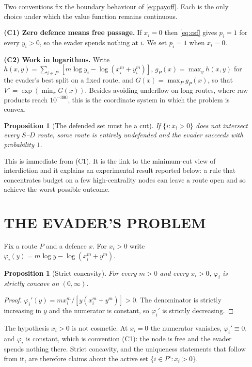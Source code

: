 \documentclass[10pt,a4paper,twoside]{article}
\theoremstyle{plain}
\newtheorem{proposition}[theorem]{Proposition}
\theoremstyle{definition}
\begin{document}
Two conventions fix the boundary behaviour of \eqref{eq:payoff}. Each is the
only choice under which the value function remains continuous.

\textbf{(C1) Zero defence means free passage.} If $x_i=0$ then
\eqref{eq:csf} gives $p_i=1$ for every $y_i>0$, so the evader spends nothing
at $i$. We set $p_i=1$ when $x_i=0$.

\textbf{(C2) Work in logarithms.} Write
$h(x,y)=\sum_{i\in P^{\circ}}[m\log y_i-\log(x_i^m+y_i^m)]$,
$g_P(x)=\max_y h(x,y)$ for the evader's best split on a fixed route, and
$G(x)=\max_P g_P(x)$, so that $V^{\star}=\exp(\min_x G(x))$. Besides avoiding
underflow on long routes, where raw products reach $10^{-300}$, this is the
coordinate system in which the problem is convex.

\begin{proposition}[The defended set must be a cut]
\label{prop:cut}
If $\{i:x_i>0\}$ does not intersect every $S$--$D$ route, some route is
entirely undefended and the evader succeeds with probability $1$.
\end{proposition}

\noindent This is immediate from (C1). It is the link to the minimum-cut view
of interdiction and it explains an experimental result reported below: a rule
that concentrates budget on a few high-centrality nodes can leave a route
open and so achieve the worst possible outcome.

\section{THE EVADER'S PROBLEM}
\label{sec:inner}

Fix a route $P$ and a defence $x$. For $x_i>0$ write
$\varphi_i(y)=m\log y-\log(x_i^m+y^m)$.

\begin{proposition}[Strict concavity]
\label{prop:concave}
For every $m>0$ and every $x_i>0$, $\varphi_i$ is strictly concave on
$(0,\infty)$.
\end{proposition}
\begin{proof}
$\varphi_i'(y)=m x_i^m/[y(x_i^m+y^m)]>0$. The denominator is strictly
increasing in $y$ and the numerator is constant, so $\varphi_i'$ is strictly
decreasing.
\end{proof}

The hypothesis $x_i>0$ is not cosmetic. At $x_i=0$ the numerator vanishes,
$\varphi_i'\equiv0$, and $\varphi_i$ is constant, which is convention (C1):
the node is free and the evader spends nothing there. Strict concavity, and
the uniqueness statements that follow from it, are therefore claims about the
active set $\{i\in P^{\circ}:x_i>0\}$.
\end{document}

